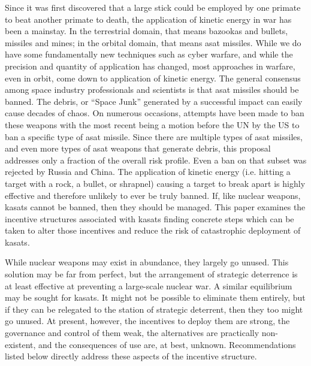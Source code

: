 
\maketitle

\pagestyle{execSummary}
\thispagestyle{firstPage}



Since it was first discovered that a large stick could be employed by
one primate to beat another primate to death, the application of
kinetic energy in war has been a mainstay.  In the terrestrial domain,
that means bazookas and bullets, missiles and mines; in the orbital
domain, that means \ac{asat} missiles.  While we do have some
fundamentally new techniques such as cyber warfare\cite{big-risks},
and while the precision and quantity of application has changed, most
approaches in warfare, even in orbit, come down to application of
kinetic energy.\cite{brian} The general consensus among space industry
professionals and scientists is that \ac{asat} missiles should be
banned.\cite{uocs-no-likey}\cite{carnegie-no-likey} The debris, or
``Space Junk'' generated by a successful impact can easily cause
decades of chaos.\cite{osa-debris} On numerous occasions, attempts
have been made to ban these weapons\cite{early-to-call} with the most
recent being a motion before the UN by the US to ban a specific type
of \ac{asat} missile.\cite{us-asat-me-not} Since there are multiple
types of \ac{asat} missiles, and even more types of \ac{asat} weapons
that generate debris, this proposal addresses only a fraction of the
overall risk profile.\cite{brian} Even a ban on that subset was
rejected by Russia and China.\cite{not-so-chinese} The application of
kinetic energy (i.e. hitting a target with a rock, a bullet, or
shrapnel) causing a target to break apart is highly effective and
therefore unlikely to ever be truly banned.  If, like nuclear weapons,
\acp{kasat} cannot be banned, then they should be managed.  This paper
examines the incentive structures associated with \acp{kasat} finding
concrete steps which can be taken to alter those incentives and reduce
the risk of catastrophic deployment of \acp{kasat}.

While nuclear weapons may exist in abundance, they largely go unused.
This solution may be far from perfect, but the arrangement of
strategic deterrence is at least effective at preventing a large-scale
nuclear war.  A similar equilibrium may be sought for \acp{kasat}.  It
might not be possible to eliminate them entirely, but if they can be
relegated to the station of strategic deterrent, then they too might
go unused.  At present, however, the incentives to deploy them are
strong, the governance and control of them weak, the alternatives are
practically non-existent, and the consequences of use are, at best,
unknown.  Recommendations listed below directly address these aspects
of the incentive structure.


